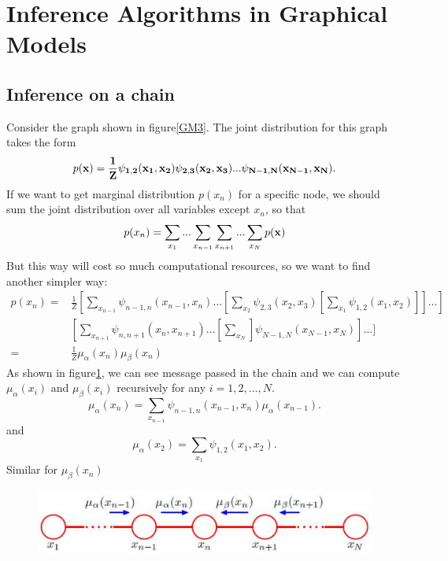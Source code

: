 \documentclass[a4paper]{book}
\begin{document}
\section{Inference Algorithms in Graphical Models}
\subsection{Inference on a chain}
Consider the graph shown in figure\ref{GM3}. The joint distribution for this graph takes the form
\begin{equation}\label{eq8.16}
  p(\bf x) = \frac{1}{Z}\psi_{1,2}(x_1,x_2)\psi_{2,3}(x_2,x_3)...\psi_{N-1,N}(x_{N-1},x_N).
\end{equation}
If we want to get marginal distribution $p(x_n)$ for a specific node, we should sum the joint distribution over all variables except $x_n$, so that
\begin{equation}\label{eq8.17}
  p(x_n) = \sum_{x_1}...\sum_{x_{n-1}}\sum_{x_{n+1}}...\sum_{x_N}p(\bf x)
\end{equation}
But this way will cost so much computational resources, so we want to find another simpler way:
\begin{align}\label{eq8.18}
  p(x_n) =  & \frac{1}{Z}[\sum_{x_{n-1}}\psi_{n-1,n}(x_{n-1},x_n)\dots[\sum_{x_2}\psi_{2,3}(x_2,x_3)[\sum_{x_1}\psi_{1,2}(x_1,x_2)]]\dots] \\
   & [\sum_{x_{n+1}}\psi_{n,n+1}(x_n,x_{n+1})\dots[\sum_{x_N}]\psi_{N-1,N}(x_{N-1},x_{N})]\dots]  \\
   = & \frac{1}{Z}\mu_{\alpha}(x_n)\mu_{\beta}(x_n)
\end{align}
As shown in figure\ref{GM4}, we can see message passed in the chain and we can compute $\mu_{\alpha}(x_i)$ and $\mu_{\beta}(x_i)$ recursively for any $i=1, 2, \dots, N$.
\begin{equation}\label{eq8.19}
  \mu_{\alpha}(x_n) = \sum_{x_{n-1}}\psi_{n-1,n}(x_{n-1},x_n)\mu_{\alpha}(x_{n-1}).
\end{equation}
and
\begin{equation}\label{eq8.20}
  \mu_{\alpha}(x_2) = \sum_{x_1}\psi_{1,2}(x_1,x_2).
\end{equation}
Similar for $\mu_{\beta}(x_n)$
\begin{figure}[bth]
  \centering
  \includegraphics[width=\textwidth]{./imgs/GM4.eps}
  \caption{}\label{GM4}
\end{figure}
\end{document}
